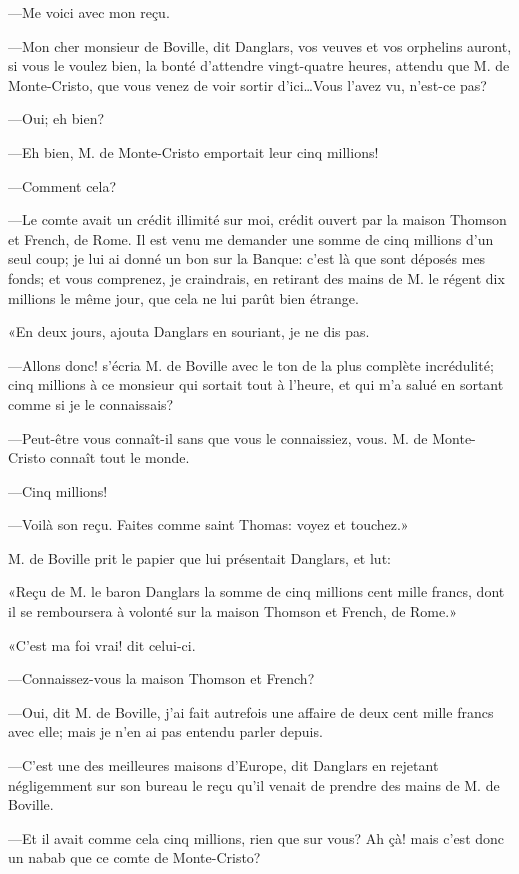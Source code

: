 —Me voici avec mon reçu. 

—Mon cher monsieur de Boville, dit Danglars, vos veuves et vos orphelins auront, si vous le voulez bien, la bonté d'attendre vingt-quatre heures, attendu que M. de Monte-Cristo, que vous venez de voir sortir d'ici\dots Vous l'avez vu, n'est-ce pas? 

—Oui; eh bien? 

—Eh bien, M. de Monte-Cristo emportait leur cinq millions! 

—Comment cela? 

—Le comte avait un crédit illimité sur moi, crédit ouvert par la maison Thomson et French, de Rome. Il est venu me demander une somme de cinq millions d'un seul coup; je lui ai donné un bon sur la Banque: c'est là que sont déposés mes fonds; et vous comprenez, je craindrais, en retirant des mains de M. le régent dix millions le même jour, que cela ne lui parût bien étrange. 

«En deux jours, ajouta Danglars en souriant, je ne dis pas. 

—Allons donc! s'écria M. de Boville avec le ton de la plus complète incrédulité; cinq millions à ce monsieur qui sortait tout à l'heure, et qui m'a salué en sortant comme si je le connaissais? 

—Peut-être vous connaît-il sans que vous le connaissiez, vous. M. de Monte-Cristo connaît tout le monde. 

—Cinq millions! 

—Voilà son reçu. Faites comme saint Thomas: voyez et touchez.» 

M. de Boville prit le papier que lui présentait Danglars, et lut: 

«Reçu de M. le baron Danglars la somme de cinq millions cent mille francs, dont il se remboursera à volonté sur la maison Thomson et French, de Rome.» 

«C'est ma foi vrai! dit celui-ci. 

—Connaissez-vous la maison Thomson et French? 

—Oui, dit M. de Boville, j'ai fait autrefois une affaire de deux cent mille francs avec elle; mais je n'en ai pas entendu parler depuis. 

—C'est une des meilleures maisons d'Europe, dit Danglars en rejetant négligemment sur son bureau le reçu qu'il venait de prendre des mains de M. de Boville. 

—Et il avait comme cela cinq millions, rien que sur vous? Ah çà! mais c'est donc un nabab que ce comte de Monte-Cristo? 

